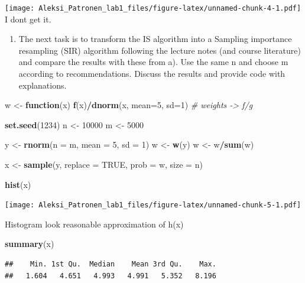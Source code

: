 \documentclass[
]{article}
\newenvironment{Shaded}{\begin{snugshade}}{\end{snugshade}}
\newcommand{\AttributeTok}[1]{\textcolor[rgb]{0.13,0.29,0.53}{#1}}
\newcommand{\CommentTok}[1]{\textcolor[rgb]{0.56,0.35,0.01}{\textit{#1}}}
\newcommand{\ConstantTok}[1]{\textcolor[rgb]{0.56,0.35,0.01}{#1}}
\newcommand{\ControlFlowTok}[1]{\textcolor[rgb]{0.13,0.29,0.53}{\textbf{#1}}}
\newcommand{\DecValTok}[1]{\textcolor[rgb]{0.00,0.00,0.81}{#1}}
\newcommand{\FunctionTok}[1]{\textcolor[rgb]{0.13,0.29,0.53}{\textbf{#1}}}
\newcommand{\NormalTok}[1]{#1}
\newcommand{\OtherTok}[1]{\textcolor[rgb]{0.56,0.35,0.01}{#1}}
\newcommand{\SpecialCharTok}[1]{\textcolor[rgb]{0.81,0.36,0.00}{\textbf{#1}}}
\providecommand{\tightlist}{%
  \setlength{\itemsep}{0pt}\setlength{\parskip}{0pt}}
\begin{document}
\texttt{[image: Aleksi\_Patronen\_lab1\_files/figure-latex/unnamed-chunk-4-1.pdf]}
I dont get it.

\begin{enumerate}
\def\labelenumi{\alph{enumi})}
\setcounter{enumi}{1}
\tightlist
\item
  The next task is to transform the IS algorithm into a Sampling
  importance resampling (SIR) algorithm following the lecture notes (and
  course literature) and compare the results with these from a). Use the
  same n and choose m according to recommendations. Discuss the results
  and provide code with explanations.
\end{enumerate}

\begin{Shaded}
\begin{Highlighting}[]
\NormalTok{w }\OtherTok{\textless{}{-}} \ControlFlowTok{function}\NormalTok{(x) }\FunctionTok{f}\NormalTok{(x)}\SpecialCharTok{/}\FunctionTok{dnorm}\NormalTok{(x, }\AttributeTok{mean=}\DecValTok{5}\NormalTok{, }\AttributeTok{sd=}\DecValTok{1}\NormalTok{) }\CommentTok{\# weights {-}\textgreater{} f/g }


\FunctionTok{set.seed}\NormalTok{(}\DecValTok{1234}\NormalTok{)}
\NormalTok{n }\OtherTok{\textless{}{-}} \DecValTok{10000}
\NormalTok{m }\OtherTok{\textless{}{-}} \DecValTok{5000}

\NormalTok{y }\OtherTok{\textless{}{-}} \FunctionTok{rnorm}\NormalTok{(}\AttributeTok{n =}\NormalTok{ m, }\AttributeTok{mean =} \DecValTok{5}\NormalTok{, }\AttributeTok{sd =} \DecValTok{1}\NormalTok{)}
\NormalTok{w }\OtherTok{\textless{}{-}}  \FunctionTok{w}\NormalTok{(y)}
\NormalTok{w }\OtherTok{\textless{}{-}}\NormalTok{ w}\SpecialCharTok{/}\FunctionTok{sum}\NormalTok{(w)}

\NormalTok{x }\OtherTok{\textless{}{-}} \FunctionTok{sample}\NormalTok{(y, }\AttributeTok{replace =} \ConstantTok{TRUE}\NormalTok{, }\AttributeTok{prob =}\NormalTok{ w, }\AttributeTok{size =}\NormalTok{ n)}

\FunctionTok{hist}\NormalTok{(x)}
\end{Highlighting}
\end{Shaded}

\texttt{[image: Aleksi\_Patronen\_lab1\_files/figure-latex/unnamed-chunk-5-1.pdf]}

Histogram look reasonable approximation of h(x)

\begin{Shaded}
\begin{Highlighting}[]
\FunctionTok{summary}\NormalTok{(x)}
\end{Highlighting}
\end{Shaded}

\begin{verbatim}
##    Min. 1st Qu.  Median    Mean 3rd Qu.    Max. 
##   1.604   4.651   4.993   4.991   5.352   8.196
\end{verbatim}
\end{document}

